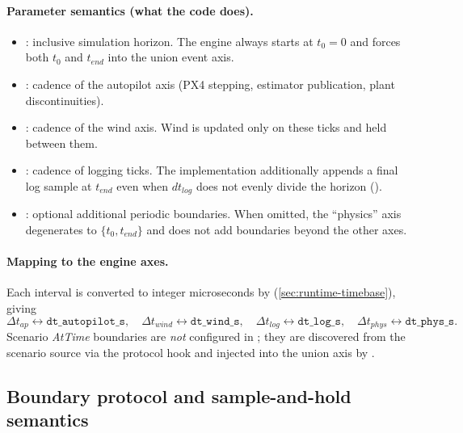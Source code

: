 \paragraph{Parameter semantics (what the code does).}
\begin{itemize}[leftmargin=*,itemsep=2pt]
  \item {}: inclusive simulation horizon. The engine always starts at \(t_0=0\) and forces both \(t_0\) and \(t_{end}\) into the union event axis.
  \item {}: cadence of the autopilot axis (PX4 stepping, estimator publication, plant discontinuities).
  \item {}: cadence of the wind axis. Wind is updated only on these ticks and held between them.
  \item {}: cadence of logging ticks. The implementation additionally appends a final log sample at \(t_{end}\) even when \(dt_{log}\) does not evenly divide the horizon ().
  \item {}: optional additional periodic boundaries. When omitted, the ``physics'' axis degenerates to \(\{t_0,t_{end}\}\) and does not add boundaries beyond the other axes.
\end{itemize}

\paragraph{Mapping to the engine axes.}
Each interval is converted to integer microseconds by  (\cref{sec:runtime-timebase}), giving
\begin{equation}
  \Delta t_{ap} \leftrightarrow \texttt{dt\_autopilot\_s},\quad
  \Delta t_{wind} \leftrightarrow \texttt{dt\_wind\_s},\quad
  \Delta t_{log} \leftrightarrow \texttt{dt\_log\_s},\quad
  \Delta t_{phys} \leftrightarrow \texttt{dt\_phys\_s}.
\end{equation}
Scenario \emph{AtTime} boundaries are \emph{not} configured in \code{[timeline]}; they are discovered from the scenario source via the  protocol hook and injected into the union axis by .

\subsection{Boundary protocol and sample-and-hold semantics}
\label{sec:runtime-boundary}

